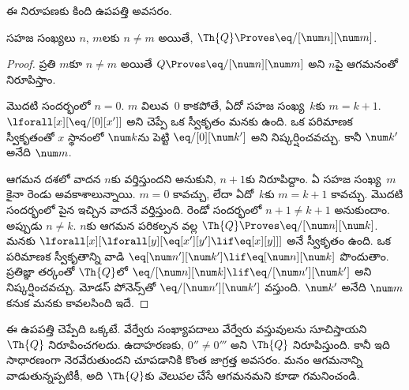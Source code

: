 \documentclass[../../../include/open-logic-section]{subfiles}
\begin{document}
ఈ నిరూపణకు కింది ఉపపత్తి అవసరం.

\begin{lem}
 సహజ సంఖ్యలు $n$, $m$లకు $n\neq m$ అయితే,
$\Th{Q}\Proves\eq/[\num n][\num m]$.
\end{lem}

\begin{proof}
ప్రతి $m$కూ $n\neq m$ అయితే $Q\Proves\eq/[\num n][\num m]$ అని
$n$పై ఆగమనంతో నిరూపిస్తాం.

మొదటి సందర్భంలో $n=0$. $m$ విలువ~$0$ కాకపోతే, ఏదో సహజ సంఖ్య~$k$కు
$m=k+1$. $\lforall[x][\eq/[0][x']]$ అని చెప్పే ఒక స్వీకృతం మనకు ఉంది.
ఒక పరిమాణక స్వీకృతంతో $x$ స్థానంలో $\num k$ను పెట్టి
$\eq/[0][\num k']$ అని నిష్కర్షించవచ్చు. కానీ $\num k'$ అనేది $\num m$.

ఆగమన దశలో వాదన $n$కు వర్తిస్తుందని అనుకుని, $n+1$కు నిరూపిద్దాం.
ఏ సహజ సంఖ్య~$m$కైనా రెండు అవకాశాలున్నాయి. $m=0$ కావచ్చు, లేదా ఏదో~$k$కు
$m=k+1$ కావచ్చు. మొదటి సందర్భంలో పైన ఇచ్చిన వాదనే వర్తిస్తుంది. రెండో సందర్భంలో
$n+1\neq k+1$ అనుకుందాం. అప్పుడు $n\neq k$. $n$కు ఆగమన పరికల్పన వల్ల
$\Th{Q}\Proves\eq/[\num n][\num k]$. మనకు
$\lforall[x][\lforall[y][\eq[x'][y']\lif\eq[x][y]]]$ అనే స్వీకృతం ఉంది.
ఒక పరిమాణక స్వీకృతాన్ని వాడి
$\eq[\num n'][\num k']\lif\eq[\num n][\num k]$ పొందుతాం. ప్రతిజ్ఞా తర్కంతో
$\Th{Q}$లో $\eq/[\num n][\num k]\lif\eq/[\num n'][\num k']$ అని
నిష్కర్షించవచ్చు. మోడస్ పోనెన్స్‌తో $\eq/[\num n'][\num k']$ వస్తుంది.
$\num k'$ అనేది $\num m$ కనుక మనకు కావలసింది ఇదే.
\end{proof}

\begin{explain}
ఈ ఉపపత్తి చెప్పేది ఒక్కటే. వేర్వేరు సంఖ్యాపదాలు వేర్వేరు వస్తువులను
సూచిస్తాయని $\Th{Q}$ నిరూపించగలదు. ఉదాహరణకు,
$0''\neq0'''$ అని $\Th{Q}$ నిరూపిస్తుంది. కానీ ఇది సాధారణంగా నెరవేరుతుందని
చూపడానికి కొంత జాగ్రత్త అవసరం. మనం ఆగమనాన్ని వాడుతున్నప్పటికీ, అది
$\Th{Q}$కు \emph{వెలుపల} చేసే ఆగమనమని కూడా గమనించండి.
\end{explain}
\end{document}
